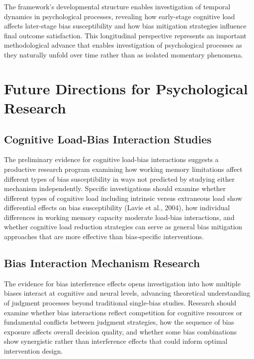 \documentclass[
  authoryear,
  preprint]{elsarticle}
\begin{document}
The framework's developmental structure enables investigation of
temporal dynamics in psychological processes, revealing how early-stage
cognitive load affects later-stage bias susceptibility and how bias
mitigation strategies influence final outcome satisfaction. This
longitudinal perspective represents an important methodological advance
that enables investigation of psychological processes as they naturally
unfold over time rather than as isolated momentary phenomena.

\section{Future Directions for Psychological
Research}\label{future-directions-for-psychological-research}

\subsection{Cognitive Load-Bias Interaction
Studies}\label{cognitive-load-bias-interaction-studies}

The preliminary evidence for cognitive load-bias interactions suggests a
productive research program examining how working memory limitations
affect different types of bias susceptibility in ways not predicted by
studying either mechanism independently. Specific investigations should
examine whether different types of cognitive load including intrinsic
versus extraneous load show differential effects on bias susceptibility
(Lavie et al., 2004), how individual differences in working memory
capacity moderate load-bias interactions, and whether cognitive load
reduction strategies can serve as general bias mitigation approaches
that are more effective than bias-specific interventions.

\subsection{Bias Interaction Mechanism
Research}\label{bias-interaction-mechanism-research}

The evidence for bias interference effects opens investigation into how
multiple biases interact at cognitive and neural levels, advancing
theoretical understanding of judgment processes beyond traditional
single-bias studies. Research should examine whether bias interactions
reflect competition for cognitive resources or fundamental conflicts
between judgment strategies, how the sequence of bias exposure affects
overall decision quality, and whether some bias combinations show
synergistic rather than interference effects that could inform optimal
intervention design.
\end{document}
